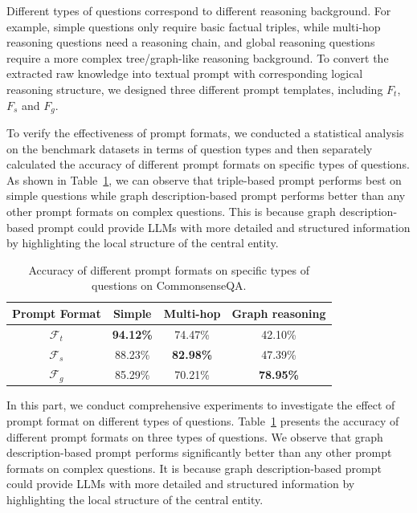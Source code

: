 \documentclass{article}
\theoremstyle{boldremark}
\begin{document}
Different types of questions correspond to different reasoning background. For example, simple questions only require basic factual triples, while multi-hop reasoning questions need a reasoning chain, and global reasoning questions require a more complex tree/graph-like reasoning background. To convert the extracted raw knowledge into textual prompt with corresponding logical reasoning structure, we designed three different prompt templates, including $F_t$,$F_s$ and $F_g$.


To verify the effectiveness of prompt formats, we conducted a statistical analysis on the benchmark datasets in terms of question types and then separately calculated the accuracy of different prompt formats on specific types of questions. As shown in Table~\ref{tab:question_type}, we can observe that triple-based prompt performs best on simple questions while graph description-based prompt performs better than any other prompt formats on complex questions. This is because graph description-based prompt could provide LLMs with more detailed and structured information by highlighting the local structure of the central entity.
\begin{table}[thp]
\centering
\vspace{-3mm}
\caption{Accuracy of different prompt formats on specific types of questions on CommonsenseQA.}
\setlength\tabcolsep{10.3pt}
\begin{tabular}{cccc}
\toprule
  \textbf{Prompt Format}   &\textbf{Simple}  & \textbf{Multi-hop} & \textbf{Graph reasoning} \\ \midrule  
   $\mathcal{F}_{t}$ & \textbf{94.12\%} &74.47\% &42.10\%\\
   $\mathcal{F}_{s}$  & 88.23\% &\textbf{82.98\%} &47.39\%\\ 
  $\mathcal{F}_{g}$  & 85.29\% &70.21\% &\textbf{78.95\%}\\ \bottomrule
\end{tabular}
\label{tab:question_type}
\vspace{-5mm}
\end{table}
 
In this part, we conduct comprehensive experiments to investigate the effect of prompt format on different types of questions. Table~\ref{tab:question_type} presents the accuracy of different prompt formats on three types of questions. We observe that graph description-based prompt performs significantly better than any other prompt formats on complex questions. It is because graph description-based prompt could provide LLMs with more detailed and structured information by highlighting the local structure of the central entity. 
\end{document}
